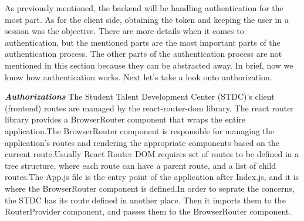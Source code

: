 \begin{justify}
        \vspace{0.25cm}
        \newendline As previously mentioned, the backend will be handling authentication for the most part. As for the client side, obtaining the token and keeping the user in a session was the objective. There are more details when it comes to authentication, but the mentioned parts are the most important parts of the authentication process. The other parts of the authentication process are not mentioned in this section because they can be abstracted away. In brief, now we know how authentication works. Next let's take a look onto authorization.

    \clearpage







    \vspace{0.25cm}
    \newendline \textbf{\textit{Authorizations}}\newendline
        The Student Talent Development Center (STDC)'s client (frontend) routes are managed by the react-router-dom library. The react router library provides a BrowserRouter component that wraps the entire application.The BrowserRouter component is responsible for managing the application's routes and rendering the appropriate components based on the current route.Usually React Router DOM requires set of routes to be defined in a tree structure, where each route can have a parent route, and a list of child routes.The App.js file is the entry point of the application after Index.js, and it is where the BrowserRouter component is defined.In order to seprate the concerns, the STDC has its route defined in another place. Then it imports them to the RouterProvider component, and passes them to the BrowserRouter component.
        

\end{justify}
